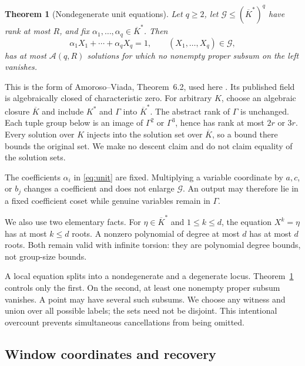 \documentclass[11pt]{article}
\newtheorem{theorem}{Theorem}[section]
\theoremstyle{definition}
\newcommand{\Acal}{\mathcal A}
\begin{document}
\begin{theorem}[Nondegenerate unit equations]
\label{thm:av}
Let \(q\geq2\), let \(\mathcal G\leq(\overline K^*)^q\) have rank at most \(R\), and fix \(\alpha_1,\ldots,\alpha_q\in\overline K^*\). Then
\begin{equation}
 \alpha_1X_1+\cdots+\alpha_qX_q=1,
 \qquad (X_1,\ldots,X_q)\in\mathcal G,
 \label{eq:unit}
\end{equation}
has at most \(\Acal(q,R)\) solutions for which no nonempty proper subsum on the left vanishes.
\end{theorem}

This is the form of Amoroso--Viada, Theorem~6.2, used here \cite{amorosoViada2009}. Its published field is algebraically closed of characteristic zero. For arbitrary \(K\), choose an algebraic closure \(\overline K\) and include \(K^*\) and \(\Gamma\) into \(\overline K^*\). The abstract rank of \(\Gamma\) is unchanged. Each tuple group below is an image of \(\Gamma^2\) or \(\Gamma^3\), hence has rank at most \(2r\) or \(3r\). Every solution over \(K\) injects into the solution set over \(\overline K\), so a bound there bounds the original set. We make no descent claim and do not claim equality of the solution sets.

The coefficients \(\alpha_i\) in \eqref{eq:unit} are fixed. Multiplying a variable coordinate by \(a,c\), or \(b_j\) changes a coefficient and does not enlarge \(\mathcal G\). An output may therefore lie in a fixed coefficient coset while genuine variables remain in \(\Gamma\).

We also use two elementary facts. For \(\eta\in\overline K^*\) and \(1\leq k\leq d\), the equation \(X^k=\eta\) has at most \(k\leq d\) roots. A nonzero polynomial of degree at most \(d\) has at most \(d\) roots. Both remain valid with infinite torsion: they are polynomial degree bounds, not group-size bounds.

A local equation splits into a nondegenerate and a degenerate locus. Theorem~\ref{thm:av} controls only the first. On the second, at least one nonempty proper subsum vanishes. A point may have several such subsums. We choose any witness and union over all possible labels; the sets need not be disjoint. This intentional overcount prevents simultaneous cancellations from being omitted.


\subsection{Window coordinates and recovery}
\end{document}
